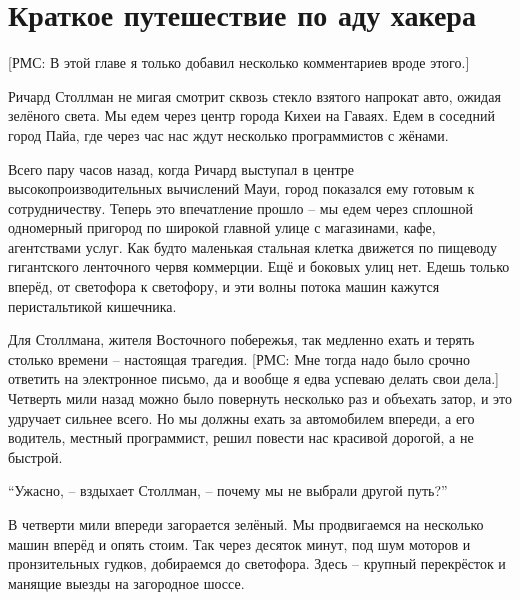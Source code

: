 

\chapter{Краткое путешествие по аду хакера}

[РМС: В этой главе я только добавил несколько комментариев вроде этого.]

Ричард Столлман не мигая смотрит сквозь стекло взятого напрокат авто, ожидая зелёного света. Мы едем через центр города Кихеи на Гаваях. Едем в соседний город Пайа, где через час нас ждут несколько программистов с жёнами.

Всего пару часов назад, когда Ричард выступал в центре высокопроизводительных вычислений Мауи, город показался ему готовым к сотрудничеству. Теперь это впечатление прошло -- мы едем через сплошной одномерный пригород по широкой главной улице с магазинами, кафе, агентствами услуг. Как будто маленькая стальная клетка движется по пищеводу гигантского ленточного червя коммерции. Ещё и боковых улиц нет. Едешь только вперёд, от светофора к светофору, и эти волны потока машин кажутся перистальтикой кишечника.

Для Столлмана, жителя Восточного побережья, так медленно ехать и терять столько времени -- настоящая трагедия. [РМС: Мне тогда надо было срочно ответить на электронное письмо, да и вообще я едва успеваю делать свои дела.] Четверть мили назад можно было повернуть несколько раз и объехать затор, и это удручает сильнее всего. Но мы должны ехать за автомобилем впереди, а его водитель, местный программист, решил повести нас красивой дорогой, а не быстрой.

\enquote{Ужасно, -- вздыхает Столлман, -- почему мы не выбрали другой путь?}

В четверти мили впереди загорается зелёный. Мы продвигаемся на несколько машин вперёд и опять стоим. Так через десяток минут, под шум моторов и пронзительных гудков, добираемся до светофора. Здесь -- крупный перекрёсток и манящие выезды на загородное шоссе.

